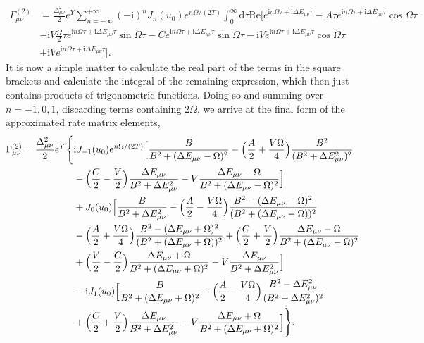 \documentclass[11pt]{article}
\begin{document}
\begin{equation}
\begin{split}
    \Gamma_{\mu\nu}^{(2)} &=\frac{\Delta_{\mu\nu}^2}{2}e^Y \sum_{n=-\infty}^{+\infty}
    (-\text{i})^n J_n(u_0)e^{n\Omega/(2T)}\int_{0}^{\infty}\text{d}\tau
    \text{Re}\Big[ e^{\text{i}n\Omega\tau+\text{i}\Delta E_{\mu\nu}\tau} 
    -A\tau e^{\text{i}n\Omega\tau+\text{i}\Delta E_{\mu\nu}\tau}\cos{\Omega\tau} \\
    &-\text{i}V\frac{\Omega}{2}\tau e^{\text{i}n\Omega\tau+\text{i}\Delta E_{\mu\nu}\tau}\sin\Omega\tau
    -C e^{\text{i}n\Omega\tau+\text{i}\Delta E_{\mu\nu}\tau}\sin\Omega\tau 
    -\text{i}V e^{\text{i}n\Omega\tau+\text{i}\Delta E_{\mu\nu}\tau}\cos\Omega\tau \\
    &+ \text{i}Ve^{\text{i}n\Omega\tau+\text{i}\Delta E_{\mu\nu}\tau}\Big].
\end{split}
\end{equation}
%
It is now a simple matter to calculate the real part of the terms in
the square brackets and calculate the integral of the remaining expression, 
which then just contains products of trigonometric functions. Doing so
and summing over $n=-1,0,1$, discarding terms containing $2\Omega$, we arrive
at the final form of the approximated rate matrix elements,
%
\begin{equation}
\begin{split}
    \Gamma_{\mu\nu}^{(2)} =\frac{\Delta_{\mu\nu}^2}{2}e^Y \Biggl\{  
    &\text{i}J_{-1}(u_0)e^{n\Omega/(2T)}\Bigl[ \frac{B}{B^2+(\Delta E_{\mu\nu}-\Omega)^2} 
    - \Bigl( \frac{A}{2}+\frac{V\Omega}{4} \Bigr) \frac{B^2}{(B^2+\Delta E_{\mu\nu}^2)^2} \\ 
    &-\Bigl( \frac{C}{2}-\frac{V}{2} \Bigr) \frac{\Delta E_{\mu\nu}}{B^2+\Delta E_{\mu\nu}^2} 
    -V\frac{\Delta E_{\mu\nu}-\Omega}{B^2+(\Delta E_{\mu\nu}-\Omega)^2} \Bigr] \\
    &+J_0(u_0) \Bigl[ \frac{B}{B^2+\Delta E_{\mu\nu}^2} - \Bigl( \frac{A}{2}-\frac{V\Omega}{4} \Bigr)
    \frac{B^2-(\Delta E_{\mu\nu}-\Omega)^2}{(B^2+(\Delta E_{\mu\nu}-\Omega))^2} \\
    &- \Bigl( \frac{A}{2}+\frac{V\Omega}{4} \Bigr)
    \frac{B^2-(\Delta E_{\mu\nu}+\Omega)^2}{(B^2+(\Delta E_{\mu\nu}+\Omega))^2} 
    + \Bigl( \frac{C}{2}+\frac{V}{2} \Bigr) \frac{\Delta E_{\mu\nu}-\Omega}{B^2+(\Delta E_{\mu\nu}-\Omega)^2} \\
    &+ \Bigl( \frac{V}{2}-\frac{C}{2} \Bigr) \frac{\Delta E_{\mu\nu}+\Omega}{B^2+(\Delta E_{\mu\nu}+\Omega)^2} 
    -V\frac{\Delta E_{\mu\nu}}{B^2+\Delta E_{\mu\nu}^2} \Bigr] \\
    &-\text{i}J_1(u_0) \Bigl[ \frac{B}{B^2+(\Delta E_{\mu\nu}+\Omega)^2} 
    -\Bigl( \frac{A}{2}-\frac{V\Omega}{4} \Bigr)
    \frac{B^2-\Delta E_{\mu\nu}^2}{(B^2+\Delta E_{\mu\nu}^2)^2} \\ 
    &+ \Bigl( \frac{C}{2}+\frac{V}{2} \Bigr) \frac{\Delta E_{\mu\nu}}{B^2+\Delta E_{\mu\nu}^2} 
    -V\frac{\Delta E_{\mu\nu}+\Omega}{B^2+(\Delta E_{\mu\nu}+\Omega)^2}\Bigr]
    \Biggr\}.
\end{split}
\end{equation}
%
\end{document}
